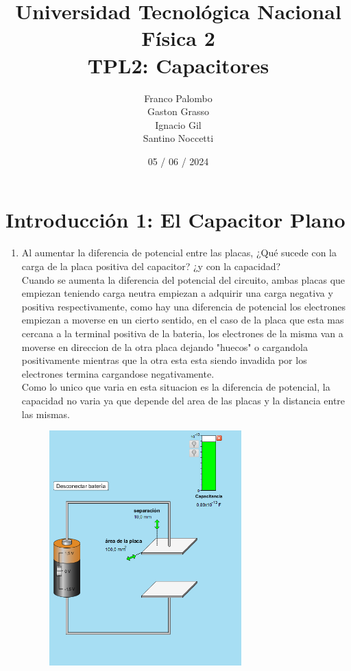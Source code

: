 \documentclass[12pt]{report}
\title{%
  \fontsize{25}{0}\selectfont Universidad Tecnológica Nacional \\
  \fontsize{22}{30}\selectfont Física 2 \\
  \fontsize{18}{25}\selectfont TPL2: Capacitores
}
\author{
  Franco Palombo\\
  Gaston Grasso\\
  Ignacio Gil\\
  Santino Noccetti\\
}
\date{05 / 06 / 2024}
\begin{document}
\maketitle

\section{Introducción 1: El Capacitor Plano}

\begin{enumerate}
    \item Al aumentar la diferencia de potencial entre las placas, ¿Qué sucede con la carga de la placa positiva del capacitor? ¿y con la capacidad?\\
    
    Cuando se aumenta la diferencia del potencial del circuito, ambas placas que empiezan teniendo carga neutra empiezan a adquirir una carga negativa y positiva respectivamente, como hay una diferencia de potencial los electrones empiezan a moverse en un cierto sentido, en el caso de la placa que esta mas cercana a la terminal positiva de la bateria, los electrones de la misma van a moverse en direccion de la otra placa  dejando "huecos" o cargandola positivamente mientras que la otra esta esta siendo invadida por los electrones termina cargandose negativamente.\\
    Como lo unico que varia en esta situacion es la diferencia de potencial, la capacidad no varia ya que depende del area de las placas y la distancia entre las mismas.\\

    
\begin{figure}[h]
    \centering
    \includegraphics[width=0.7\textwidth]{./images/1FOTO1.png}
\end{figure}


\end{enumerate}
\end{document}
